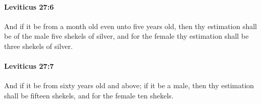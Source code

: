 		\paragraph{Leviticus 27:6} %
			\label{LEVITICUS-27-6}

			And if it be from a month old even unto five years old, then thy estimation shall be of the male five shekels of silver, and for the female thy estimation shall be three shekels of silver.


		\paragraph{Leviticus 27:7} %
			\label{LEVITICUS-27-7}

			And if it be from sixty years old and above; if it be a male, then thy estimation shall be fifteen shekels, and for the female ten shekels.


